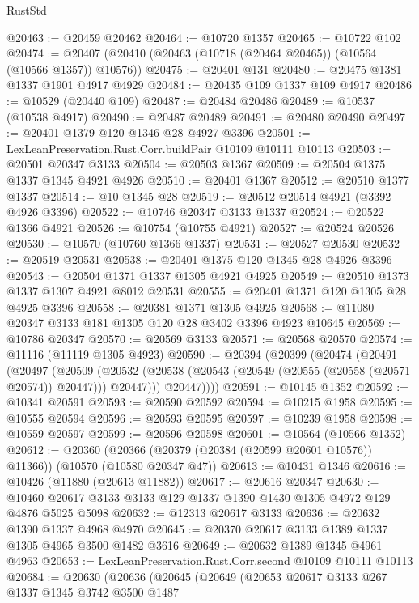 \begin{lexlean}{RustStd}
\begin{coremodule}
@20463 := @20459 @20462
@20464 := @10720 @1357
@20465 := @10722 @102
@20474 := @20407 (@20410 (@20463 (@10718 (@20464 @20465)) (@10564 (@10566 @1357)) @10576))
@20475 := @20401 @131
@20480 := @20475 @1381 @1337 @1901 @4917 @4929
@20484 := @20435 @109 @1337 @109 @4917
@20486 := @10529 (@20440 @109)
@20487 := @20484 @20486
@20489 := @10537 (@10538 @4917)
@20490 := @20487 @20489
@20491 := @20480 @20490
@20497 := @20401 @1379 @120 @1346 @28 @4927 @3396
@20501 := LexLeanPreservation.Rust.Corr.buildPair @10109 @10111 @10113
@20503 := @20501 @20347 @3133
@20504 := @20503 @1367
@20509 := @20504 @1375 @1337 @1345 @4921 @4926
@20510 := @20401 @1367
@20512 := @20510 @1377 @1337
@20514 := @10 @1345 @28
@20519 := @20512 @20514 @4921 (@3392 @4926 @3396)
@20522 := @10746 @20347 @3133 @1337
@20524 := @20522 @1366 @4921
@20526 := @10754 (@10755 @4921)
@20527 := @20524 @20526
@20530 := @10570 (@10760 @1366 @1337)
@20531 := @20527 @20530
@20532 := @20519 @20531
@20538 := @20401 @1375 @120 @1345 @28 @4926 @3396
@20543 := @20504 @1371 @1337 @1305 @4921 @4925
@20549 := @20510 @1373 @1337 @1307 @4921 @8012 @20531
@20555 := @20401 @1371 @120 @1305 @28 @4925 @3396
@20558 := @20381 @1371 @1305 @4925
@20568 := @11080 @20347 @3133 @181 @1305 @120 @28 @3402 @3396 @4923 @10645
@20569 := @10786 @20347
@20570 := @20569 @3133
@20571 := @20568 @20570
@20574 := @11116 (@11119 @1305 @4923)
@20590 := @20394
    (@20399
      (@20474
        (@20491
          (@20497
            (@20509
              (@20532 (@20538 (@20543 (@20549 (@20555 (@20558 (@20571 @20574)) @20447))) @20447)))
            @20447))))
@20591 := @10145 @1352
@20592 := @10341 @20591
@20593 := @20590 @20592
@20594 := @10215 @1958
@20595 := @10555 @20594
@20596 := @20593 @20595
@20597 := @10239 @1958
@20598 := @10559 @20597
@20599 := @20596 @20598
@20601 := @10564 (@10566 @1352)
@20612 := @20360
    (@20366 (@20379 (@20384 (@20599 @20601 @10576)) @11366))
    (@10570 (@10580 @20347 @47))
@20613 := @10431 @1346
@20616 := @10426 (@11880 (@20613 @11882))
@20617 := @20616 @20347
@20630 := @10460 @20617 @3133 @3133 @129 @1337 @1390 @1430 @1305 @4972 @129 @4876 @5025 @5098
@20632 := @12313 @20617 @3133
@20636 := @20632 @1390 @1337 @4968 @4970
@20645 := @20370 @20617 @3133 @1389 @1337 @1305 @4965 @3500 @1482 @3616
@20649 := @20632 @1389 @1345 @4961 @4963
@20653 := LexLeanPreservation.Rust.Corr.second @10109 @10111 @10113
@20684 := @20630
    (@20636
      (@20645
        (@20649
          (@20653
            @20617
            @3133
            @267
            @1337
            @1345
            @3742
            @3500
            @1487

\end{coremodule}
\end{lexlean}
